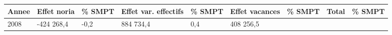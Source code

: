 \begin{longtable}[]{@{}lllllllll@{}}
\toprule
\begin{minipage}[b]{0.05\columnwidth}\raggedright
Annee\strut
\end{minipage} & \begin{minipage}[b]{0.10\columnwidth}\raggedright
Effet noria\strut
\end{minipage} & \begin{minipage}[b]{0.06\columnwidth}\raggedright
\% SMPT\strut
\end{minipage} & \begin{minipage}[b]{0.16\columnwidth}\raggedright
Effet var. effectifs\strut
\end{minipage} & \begin{minipage}[b]{0.06\columnwidth}\raggedright
\% SMPT\strut
\end{minipage} & \begin{minipage}[b]{0.12\columnwidth}\raggedright
Effet vacances\strut
\end{minipage} & \begin{minipage}[b]{0.06\columnwidth}\raggedright
\% SMPT\strut
\end{minipage} & \begin{minipage}[b]{0.10\columnwidth}\raggedright
Total\strut
\end{minipage} & \begin{minipage}[b]{0.06\columnwidth}\raggedright
\% SMPT\strut
\end{minipage}\tabularnewline
\midrule
\endhead
\begin{minipage}[t]{0.05\columnwidth}\raggedright
2008\strut
\end{minipage} & \begin{minipage}[t]{0.10\columnwidth}\raggedright
-424 268,4\strut
\end{minipage} & \begin{minipage}[t]{0.06\columnwidth}\raggedright
-0,2\strut
\end{minipage} & \begin{minipage}[t]{0.16\columnwidth}\raggedright
884 734,4\strut
\end{minipage} & \begin{minipage}[t]{0.06\columnwidth}\raggedright
0,4\strut
\end{minipage} & \begin{minipage}[t]{0.12\columnwidth}\raggedright
408 256,5\strut
\end{minipage} & \begin{minipage}[t]{0.06\columnwidth}\raggedright

\end{minipage}
\end{longtable}
